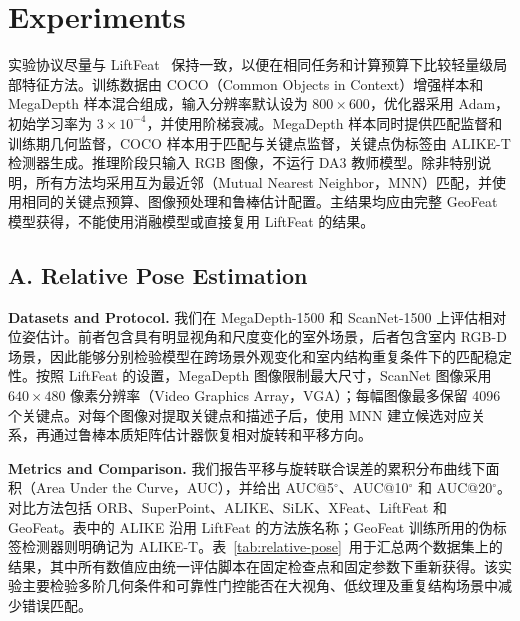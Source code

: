 \documentclass{article}
\begin{document}
\section{Experiments}
实验协议尽量与 LiftFeat~\cite{LiftFeat} 保持一致，以便在相同任务和计算预算下比较轻量级局部特征方法。训练数据由 COCO（Common Objects in Context）增强样本和 MegaDepth 样本混合组成，输入分辨率默认设为 $800\times600$，优化器采用 Adam，初始学习率为 $3\times10^{-4}$，并使用阶梯衰减。MegaDepth 样本同时提供匹配监督和训练期几何监督，COCO 样本用于匹配与关键点监督，关键点伪标签由 ALIKE-T 检测器生成。推理阶段只输入 RGB 图像，不运行 DA3 教师模型。除非特别说明，所有方法均采用互为最近邻（Mutual Nearest Neighbor，MNN）匹配，并使用相同的关键点预算、图像预处理和鲁棒估计配置。主结果均应由完整 GeoFeat 模型获得，不能使用消融模型或直接复用 LiftFeat 的结果。

\subsection{A. Relative Pose Estimation}
\noindent\textbf{Datasets and Protocol.} 我们在 MegaDepth-1500 和 ScanNet-1500 上评估相对位姿估计。前者包含具有明显视角和尺度变化的室外场景，后者包含室内 RGB-D 场景，因此能够分别检验模型在跨场景外观变化和室内结构重复条件下的匹配稳定性。按照 LiftFeat 的设置，MegaDepth 图像限制最大尺寸，ScanNet 图像采用 $640\times480$ 像素分辨率（Video Graphics Array，VGA）；每幅图像最多保留 4096 个关键点。对每个图像对提取关键点和描述子后，使用 MNN 建立候选对应关系，再通过鲁棒本质矩阵估计器恢复相对旋转和平移方向。

\noindent\textbf{Metrics and Comparison.} 我们报告平移与旋转联合误差的累积分布曲线下面积（Area Under the Curve，AUC），并给出 AUC@5$^\circ$、AUC@10$^\circ$ 和 AUC@20$^\circ$。对比方法包括 ORB、SuperPoint、ALIKE、SiLK、XFeat、LiftFeat 和 GeoFeat。表中的 ALIKE 沿用 LiftFeat 的方法族名称；GeoFeat 训练所用的伪标签检测器则明确记为 ALIKE-T。表~\ref{tab:relative-pose}~用于汇总两个数据集上的结果，其中所有数值应由统一评估脚本在固定检查点和固定参数下重新获得。该实验主要检验多阶几何条件和可靠性门控能否在大视角、低纹理及重复结构场景中减少错误匹配。
\end{document}
